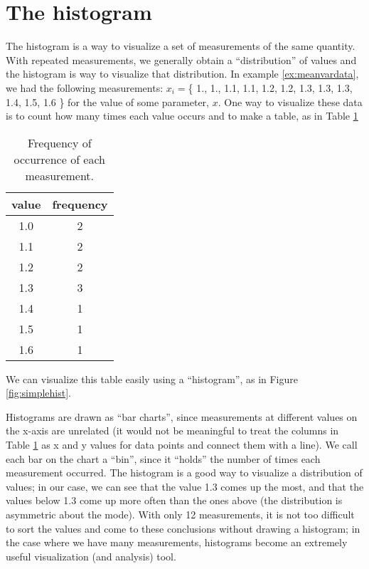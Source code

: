 \section{The histogram}
The histogram is a way to visualize a set of measurements of the same quantity. With repeated measurements, we generally obtain a ``distribution'' of values and the histogram is  way to visualize that distribution. In example \ref{ex:meanvardata}, we had the following measurements: $x_i=$\{ 1., 1., 1.1, 1.1, 1.2, 1.2, 1.3, 1.3, 1.3, 1.4, 1.5, 1.6 \} for the value of some parameter, $x$. One way to visualize these data is to count how many times each value occurs and to make a table, as in Table \ref{tab:measfreq}
\begin{table}[!ht]
\center
\begin{tabular}{|c|c|}
\hline
value & frequency\\
\hline
1.0 &2\\
\hline
1.1 &2\\
\hline
1.2 &2\\
\hline
1.3 &3\\
\hline
1.4 &1\\
\hline
1.5 &1\\
\hline
1.6 &1\\
\hline
\end{tabular}
\caption{\label{tab:measfreq}Frequency of occurrence of each measurement.}
\end{table}

We can visualize this table easily using a ``histogram'', as in Figure \ref{fig:simplehist}.

Histograms are drawn as ``bar charts'', since measurements at different values on the x-axis are unrelated (it would not be meaningful to treat the columns in Table \ref{tab:measfreq} as x and y values for data points and connect them with a line). We call each bar on the chart a ``bin'', since it ``holds'' the number of times each measurement occurred. The histogram is a good way to visualize a distribution of values; in our case, we can see that the value 1.3 comes up the most, and that the values below 1.3 come up more often than the ones above (the distribution is asymmetric about the mode). With only 12 measurements, it is not too difficult to sort the values and come to these conclusions without drawing a histogram; in the case where we have many measurements, histograms become an extremely useful visualization (and analysis) tool.

